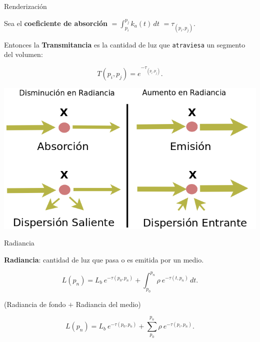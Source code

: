 \documentclass[spanish]{beamer}
\begin{document}
\begin{frame}{Renderización}


Sea el \textbf{coeficiente de absorción} $ = \int_{p_i}^{p_j} k_a(t) \, dt$  $ = \tau_{(p_i, p_j)}$.


Entonces la \textbf{Transmitancia} es la cantidad de luz que \texttt{atraviesa} un segmento del volumen:

\begin{equation*}
  T(p_i,p_j) = e^{-\tau_{(p_i, p_j)}}.
\end{equation*}


\centerline{\includegraphics[scale = 0.25]{../figures/fenomenosrte}}


\end{frame}

\begin{frame}{Radiancia}


\textbf{Radiancia}: cantidad de luz que pasa o es emitida por un medio.

\begin{equation*}
  L(p_n) = L_b \ e^{-\tau(p_0, p_n)} + \int_{p_0}^{p_n} \rho \ e^{-\tau(t,p_n)} \, dt.
\end{equation*}

(Radiancia de fondo $+$ Radiancia del medio)


\begin{equation*}
  L(p_n) = L_b \ e^{-\tau(p_0, p_n)} + \sum_{p_0}^{p_n} \rho \ e^{-\tau(p_i,p_n)}.
\end{equation*}


\end{frame}
\end{document}
